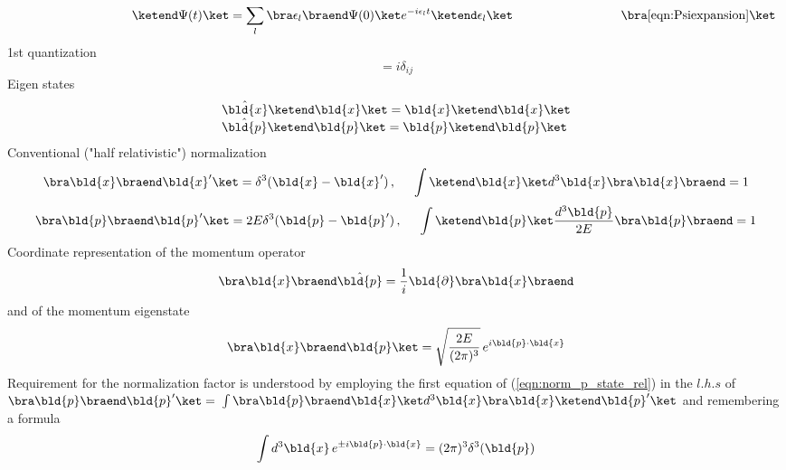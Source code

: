 \begin{equation*}
\hspace{32mm}
\ketend \Psi(t) \ket =
\sum_l \bra \epsilon_l \braend   \Psi(0) \ket
e^{-i \epsilon_l t} \ketend \epsilon_l \ket
\hspace{30mm}
\bra \ref{eqn:Psiexpansion} \ket
\end{equation*}
%
1st quantization
\begin{equation}
[\hat{x}_i, \hat{p}_j] = i \delta_{ij}
\end{equation}
Eigen states
\begin{equation}
\begin{array}{l}
\hat{\bld{x}} \ketend \bld{x} \ket = \bld{x} \ketend \bld{x} \ket
\\
\hat{\bld{p}} \ketend \bld{p} \ket = \bld{p} \ketend \bld{p} \ket
\end{array}
\end{equation}
Conventional ("half relativistic") normalization
\begin{equation}
\bra \bld{x} \braend \bld{x}' \ket = \delta^3(\bld{x}-\bld{x}')\,,
\hspace{5mm}
\int \ketend \bld{x} \ket d^3 \bld{x} \bra \bld{x} \braend = 1
\end{equation}
\begin{equation}
\bra \bld{p} \braend \bld{p}' \ket = 2E \delta^3(\bld{p}-\bld{p}')\,,
\hspace{5mm}
\int \ketend \bld{p} \ket \frac{d^3 \bld{p}}{2E} \bra \bld{p} \braend = 1
\label{eqn:norm_p_state_rel}
\end{equation}
Coordinate representation of the momentum operator
\begin{equation}
\bra \bld{x} \braend \hat{\bld{p}}
=
\frac{1}{i} \bld{\partial} \bra \bld{x} \braend
\end{equation}
and of the momentum eigenstate
\begin{equation}
\bra \bld{x} \braend \bld{p} \ket
=
\sqrt{\frac{2E}{(2\pi)^3}}\, e^{i \bld{p} \cdot \bld{x}}
\end{equation}
Requirement for the normalization factor is understood by employing
the first equation of (\ref{eqn:norm_p_state_rel}) in the $l.h.s$ of
$\nolinebreak{\bra \bld{p} \braend \bld{p}' \ket}= $
$\nolinebreak{\int \bra \bld{p} \braend \bld{x} \ket d^3\bld{x} \bra \bld{x} \ketend \bld{p}' \ket}$
and remembering a formula
\[
\int {d^3 \bld{x}}\, e^{\pm i \bld{p} \cdot \bld{x}}= (2\pi)^3 \delta^3 (\bld{p})
\]
